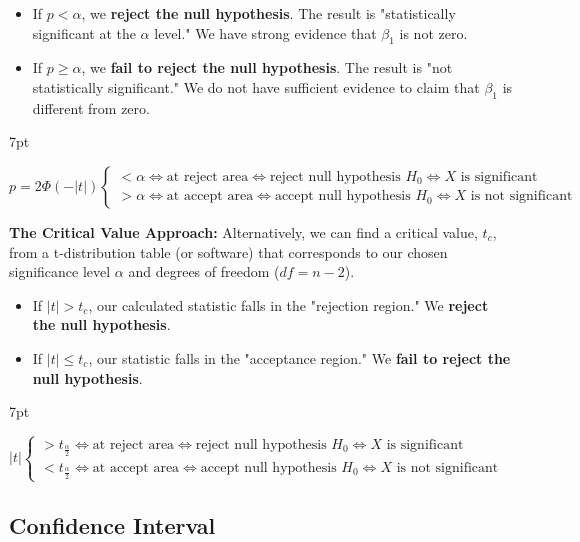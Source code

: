 \documentclass{article}
\providecommand{\tightlist}{
  \setlength{\itemsep}{0pt}
  \setlength{\parskip}{0pt}}
\newenvironment{blueblock}{
\def\FrameCommand{
  \hspace{1pt}
    {\color{DarkBlue}
    \vrule width 2pt}
    {\color{blueshade}
    \vrule width 4pt}
  \colorbox{blueshade}
}
\MakeFramed{
  \advance
  \hsize-
  \width
  \FrameRestore}
\noindent\hspace{-4.55pt}%
\begin{adjustwidth}{}{7pt}
\vspace{2pt}\vspace{2pt}
}
{\vspace{2pt}\end{adjustwidth}\endMakeFramed}
\begin{document}
\begin{itemize}
\tightlist
  \item If $p < \alpha$, we \textbf{reject the null hypothesis}. The result is "statistically significant at the $\alpha$ level." We have strong evidence that $\beta_1$ is not zero.
  \item If $p \ge \alpha$, we \textbf{fail to reject the null hypothesis}. The result is "not statistically significant." We do not have sufficient evidence to claim that $\beta_1$ is different from zero.
\end{itemize}

\begin{blueblock}
$p=2 \Phi(-|t|) 
\begin{cases}
  < \alpha \iff \text{at reject area} \iff \text{reject null hypothesis $H_0$} \iff \text{$X$ is significant}
  \\
  > \alpha \iff \text{at accept area} \iff \text{accept null hypothesis $H_0$} \iff \text{$X$ is not significant}
\end{cases}$
\end{blueblock}



\textbf{The Critical Value Approach:} Alternatively, we can find a critical value, $t_c$, from a t-distribution table (or software) that corresponds to our chosen significance level $\alpha$ and degrees of freedom ($df=n-2$).

\begin{itemize}
\tightlist
  \item If $|t| > t_c$, our calculated statistic falls in the "rejection region." We \textbf{reject the null hypothesis}.
  \item If $|t| \le t_c$, our statistic falls in the "acceptance region." We \textbf{fail to reject the null hypothesis}.
\end{itemize}


\begin{blueblock}
$|t|
\begin{cases}
>t_{\frac{\alpha}{2}} \iff \text{at reject area} \iff \text{reject null hypothesis $H_0$} \iff \text{$X$ is significant}
\\
<t_{\frac{\alpha}{2}} \iff \text{at accept area} \iff \text{accept null hypothesis $H_0$} \iff \text{$X$ is not significant}
\end{cases}$
\end{blueblock}



\subsection{Confidence Interval} %
\label{subp:confidence_interval}
\end{document}
